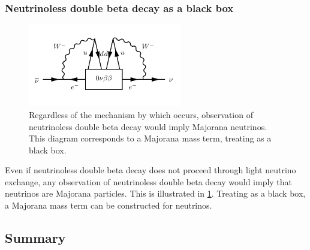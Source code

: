 \documentclass[herrin-thesis.tex]{subfiles}
\begin{document}
\subsubsection{Neutrinoless double beta decay as a black box}

\begin{figure}[htp]
	\centering
	\includegraphics[width=0.6\textwidth]{./feynman_diagrams/zeronubetabeta_blackbox.pdf}
	\caption[Observation of \zeronu{} implies Majorana neutrinos]{Regardless of the mechanism by which \zeronu{} occurs, observation of neutrinoless double beta decay would imply Majorana neutrinos. This diagram corresponds to a Majorana mass term, treating \zeronu{} as a black box.}
	\label{fig:nu_blackbox}
\end{figure}

Even if neutrinoless double beta decay does not proceed through light neutrino exchange, any observation of neutrinoless double beta decay would imply that neutrinos are Majorana particles. This is illustrated in \cref{fig:nu_blackbox}. Treating \zeronu{} as a black box, a Majorana mass term can be constructed for neutrinos.

\subsection{Summary}
\end{document}
